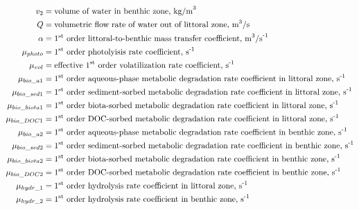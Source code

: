 \documentclass[fleqn, oneside, 11pt]{article}%
\begin{document}
\begin{preview}
\begin{align*}
v_{2} & = \text{volume of water in benthic zone, kg/m}^{\text{3}} \nonumber \\
Q & = \text{volumetric flow rate of water out of littoral zone, m}^{\text{3}}\text{/s} \nonumber \\
\alpha & = \text{1}^{\text{st}}\text{\space order littoral-to-benthic mass transfer coefficient, m}^{\text{3}}\text{/s}^{\text{-1}} \nonumber \\
\mu_{photo} & = \text{1}^{\text{st}}\text{\space order photolyisis rate coefficient, s}^{\text{-1}} \nonumber \\
\mu_{vol} & = \text{effective 1}^{\text{st}}\text{\space order volatilization rate coefficient, s}^{\text{-1}} \nonumber \\
\mu_{bio\_a1} & = \text{1}^{\text{st}}\text{\space order aqueous-phase metabolic degradation rate coefficient in littoral zone, s}^{\text{-1}} \nonumber \\
\mu_{bio\_sed1} & = \text{1}^{\text{st}}\text{\space order sediment-sorbed metabolic degradation rate coefficient in littoral zone, s}^{\text{-1}} \nonumber \\
\mu_{bio\_biota1} & = \text{1}^{\text{st}}\text{\space order biota-sorbed metabolic degradation rate coefficient in littoral zone, s}^{\text{-1}} \nonumber \\
\mu_{bio\_DOC1} & = \text{1}^{\text{st}}\text{\space order DOC-sorbed metabolic degradation rate coefficient in littoral zone, s}^{\text{-1}} \nonumber \\
\mu_{bio\_a2} & = \text{1}^{\text{st}}\text{\space order aqueous-phase metabolic degradation rate coefficient in benthic zone, s}^{\text{-1}} \nonumber \\
\mu_{bio\_sed2} & = \text{1}^{\text{st}}\text{\space order sediment-sorbed metabolic degradation rate coefficient in benthic zone, s}^{\text{-1}} \nonumber \\
\mu_{bio\_biota2} & = \text{1}^{\text{st}}\text{\space order biota-sorbed metabolic degradation rate coefficient in benthic zone, s}^{\text{-1}} \nonumber \\
\mu_{bio\_DOC2} & = \text{1}^{\text{st}}\text{\space order DOC-sorbed metabolic degradation rate coefficient in benthic zone, s}^{\text{-1}} \nonumber \\
\mu_{hydr\_1} & = \text{1}^{\text{st}}\text{\space order hydrolysis rate coefficient in littoral zone, s}^{\text{-1}} \nonumber \\
\mu_{hydr\_2} & = \text{1}^{\text{st}}\text{\space order hydrolysis rate coefficient in benthic zone, s}^{\text{-1}} \nonumber \\
\end{align*} 
\end{preview}
\end{document}
